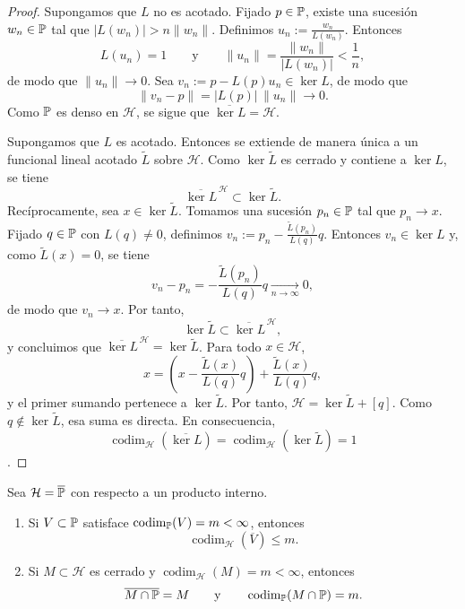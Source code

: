 \begin{proof}
	Supongamos que $L$ no es acotado. Fijado $p\in\mathbb{P}$, existe una sucesión $w_n\in\mathbb{P}$ tal que $|L(w_n)|>n\|w_n\|$. Definimos $u_n:=\frac{w_n}{L(w_n)}$. Entonces $$L(u_n)=1 \qquad \text{y}\qquad \|u_n\|=\frac{\|w_n\|}{|L(w_n)|}<\frac1n,$$
	de modo que $\|u_n\|\to0$. Sea $v_n:=p-L(p)u_n\in\ker L$, de modo que $$\|v_n-p\|=|L(p)|\,\|u_n\|\to 0.$$
	Como $\mathbb{P}$ es denso en $\mathcal H$, se sigue que $\overline{\ker L}=\mathcal H$.

	Supongamos que $L$ es acotado. Entonces se extiende de manera única a un funcional lineal acotado $\widetilde L$ sobre $\mathcal H$. Como $\ker\widetilde L$ es cerrado y contiene a $\ker L$, se tiene \[\overline{\ker L}^{\,\mathcal H}\subset \ker\widetilde L.\]
	Recíprocamente, sea $x\in\ker\widetilde L$. Tomamos una sucesión $p_n\in\mathbb{P}$ tal que $p_n\to x$. Fijado $q\in\mathbb{P}$ con $L(q)\neq 0$, definimos \(v_n:=p_n-\frac{\widetilde L(p_n)}{L(q)}q\). Entonces $v_n\in\ker L$ y, como $\widetilde L(x)=0$, se tiene \[v_n-p_n=-\frac{\widetilde L(p_n)}{L(q)}q\xrightarrow[n\to\infty]{}0,\]
	de modo que $v_n\to x$. Por tanto, \[\ker\widetilde L\subset \overline{\ker L}^{\,\mathcal H},\] y concluimos que \(\overline{\ker L}^{\,\mathcal H}=\ker\widetilde L\).
	Para todo $x\in\mathcal H$,
	\[
		x=\left(x-\frac{\widetilde L(x)}{L(q)}q\right)+\frac{\widetilde L(x)}{L(q)}q,
	\]
	y el primer sumando pertenece a $\ker\widetilde L$. Por tanto, $\mathcal H=\ker\widetilde L+[q]$.
	Como $q\notin\ker\widetilde L$, esa suma es directa. En consecuencia, \[\operatorname{codim}_{\mathcal H}(\overline{\ker L})=\operatorname{codim}_{\mathcal H}(\ker\widetilde L)=1\].
\end{proof}

\begin{prop}\label{prop:relacion_codimensiones}
	Sea $\mathcal H=\overline{\mathbb{P}}$ con respecto a un producto interno.
	\begin{enumerate}
		\item Si $V\subset\mathbb{P}$ satisface $\operatorname{codim}_{\mathbb{P}}(V)=m<\infty$, entonces
		      \[
			      \operatorname{codim}_{\mathcal H}(\overline V)\le m.
		      \]
		\item Si $M\subset\mathcal H$ es cerrado y $\operatorname{codim}_{\mathcal H}(M)=m<\infty$, entonces
		      \[
			      \overline{M\cap\mathbb{P}}=M
			      \qquad\text{y}\qquad
			      \operatorname{codim}_{\mathbb{P}}(M\cap\mathbb{P})=m.
		      \]
	\end{enumerate}
\end{prop}

